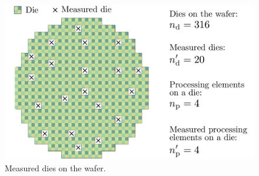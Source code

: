 \begin{figure}
  \centering
  \includegraphics[width=0.9\linewidth]{include/figures/wafer-measured.pdf}
  \caption{Measured dies on the wafer.}
  \vspace{-1.5em}
\end{figure}
